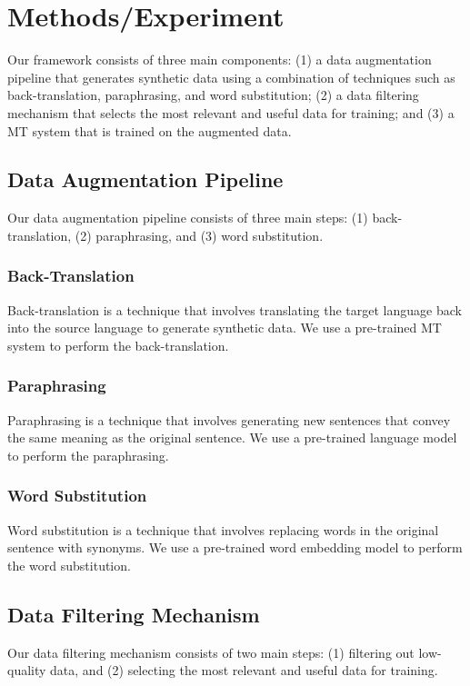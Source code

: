 \documentclass{article}
\begin{document}
\section{Methods/Experiment}
Our framework consists of three main components: (1) a data augmentation pipeline that generates synthetic data using a combination of techniques such as back-translation, paraphrasing, and word substitution; (2) a data filtering mechanism that selects the most relevant and useful data for training; and (3) a MT system that is trained on the augmented data.

\subsection{Data Augmentation Pipeline}
Our data augmentation pipeline consists of three main steps: (1) back-translation, (2) paraphrasing, and (3) word substitution.

\subsubsection{Back-Translation}
Back-translation is a technique that involves translating the target language back into the source language to generate synthetic data. We use a pre-trained MT system to perform the back-translation.

\subsubsection{Paraphrasing}
Paraphrasing is a technique that involves generating new sentences that convey the same meaning as the original sentence. We use a pre-trained language model to perform the paraphrasing.

\subsubsection{Word Substitution}
Word substitution is a technique that involves replacing words in the original sentence with synonyms. We use a pre-trained word embedding model to perform the word substitution.

\subsection{Data Filtering Mechanism}
Our data filtering mechanism consists of two main steps: (1) filtering out low-quality data, and (2) selecting the most relevant and useful data for training.
\end{document}
